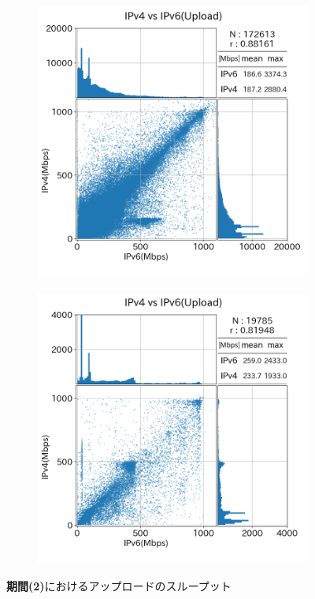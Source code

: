 \begin{figure}[htbp]
\begin{center}
        \begin{subfigure}[b]{0.49\textwidth}
            \centering
            \includegraphics[width=1.0\textwidth]{fig/new_sameISP_ul.png}
            \label{new_sameISP_ul}
        \end{subfigure}
        \begin{subfigure}[b]{0.49\textwidth}
            \centering
            \includegraphics[width=1.0\textwidth]{fig/new_diffISP_ul.png}
            \label{new_diffISP_ul}
        \end{subfigure}
        \caption{{\bf 期間(2)}におけるアップロードのスループット}
        \label{fig:new_isp_ul}
    \end{center}
\end{figure}
\FloatBarrier

